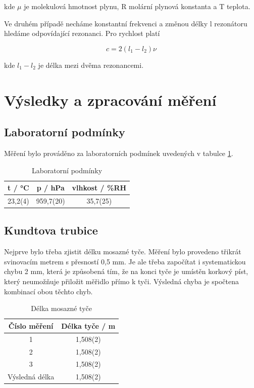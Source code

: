 kde \(\mu\) je molekulová hmotnost plynu, R molární plynová konstanta a T teplota.

Ve druhém případě necháme konstantní frekvenci a změnou délky l rezonátoru hledáme odpovídající rezonanci. Pro rychlost platí

\begin{equation}
    c = 2(l_1-l_2)\nu
\end{equation}

kde \(l_1-l_2\) je délka mezi dvěma rezonancemi.

\section{Výsledky a zpracování měření}

\subsection{Laboratorní podmínky}

    Měření bylo prováděno za laboratorních podmínek uvedených v tabulce \ref{tab:lab_pod}. 

    \begin{table}[h]
        \centering
        \caption{Laboratorní podmínky}
        \label{tab:lab_pod}
        \begin{tabular}{|c|c|c|} 
        \hline
            t / °C & p / hPa & vlhkost / \%RH  \\ 
        \hline
            23,2(4)   & 959,7(20)   & 35,7(25)            \\
        \hline
        \end{tabular}
    \end{table}

\subsection{Kundtova trubice}
Nejprve bylo třeba zjistit délku mosazné tyče. Měření bylo provedeno třikrát svinovacím metrem s přesností 0,5 mm. Je ale třeba započítat i systematickou chybu 2 mm, která je způsobená tím, že na konci tyče je umístěn korkový píst, který neumožňuje přiložit měřidlo přímo k tyči. Výsledná chyba je spočtena kombinací obou těchto chyb.

\begin{table}[h]
\centering
\caption{Délka mosazné tyče}
\label{tab:delka-tyce}
\begin{tabular}{|c|c|} 
\hline
Číslo měření   & Délka tyče / m  \\ 
\hline
1              & 1,508(2)        \\
2              & 1,508(2)        \\
3              & 1,508(2)        \\ 
\hline
Výsledná délka & 1,508(2)        \\
\hline
\end{tabular}
\end{table}

